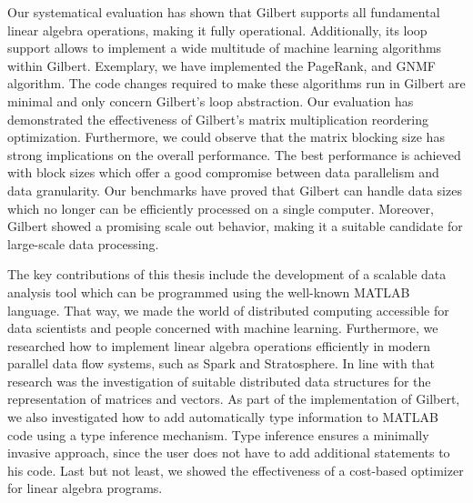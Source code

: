 Our systematical evaluation has shown that Gilbert supports all fundamental linear algebra operations, making it fully operational.
Additionally, its loop support allows to implement a wide multitude of machine learning algorithms within Gilbert.
Exemplary, we have implemented the PageRank, \kmeans and GNMF algorithm.
The code changes required to make these algorithms run in Gilbert are minimal and only concern Gilbert's loop abstraction.
Our evaluation has demonstrated the effectiveness of Gilbert's matrix multiplication reordering optimization.
Furthermore, we could observe that the matrix blocking size has strong implications on the overall performance.
The best performance is achieved with block sizes which offer a good compromise between data parallelism and data granularity.
Our benchmarks have proved that Gilbert can handle data sizes which no longer can be efficiently processed on a single computer.
Moreover, Gilbert showed a promising scale out behavior, making it a suitable candidate for large-scale data processing.

The key contributions of this thesis include the development of a scalable data analysis tool which can be programmed using the well-known MATLAB language.
That way, we made the world of distributed computing accessible for data scientists and people concerned with machine learning.
Furthermore, we researched how to implement linear algebra operations efficiently in modern parallel data flow systems, such as Spark and Stratosphere.
In line with that research was the investigation of suitable distributed data structures for the representation of matrices and vectors.
As part of the implementation of Gilbert, we also investigated how to add automatically type information to MATLAB code using a type inference mechanism.
Type inference ensures a minimally invasive approach, since the user does not have to add additional statements to his code.
Last but not least, we showed the effectiveness of a cost-based optimizer for linear algebra programs.

